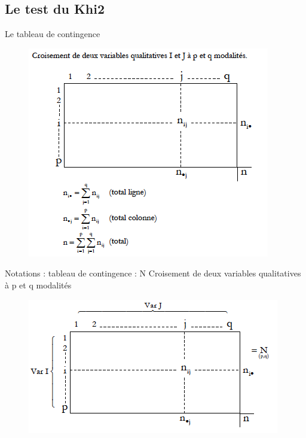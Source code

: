 \documentclass[11pt]{beamer}
\begin{document}
\subsection{Le test du Khi2}




\begin{frame}{Le tableau de contingence}
\begin{figure}
\includegraphics[scale=0.6]{Exemple3.png}  
\end{figure}
\end{frame}

\begin{frame}{Notations : tableau de contingence : N}
Croisement de deux variables qualitatives à p et q modalités

\begin{figure}
\includegraphics[scale=0.7]{exemple8.png}  
\end{figure}
\end{frame}
\end{document}
